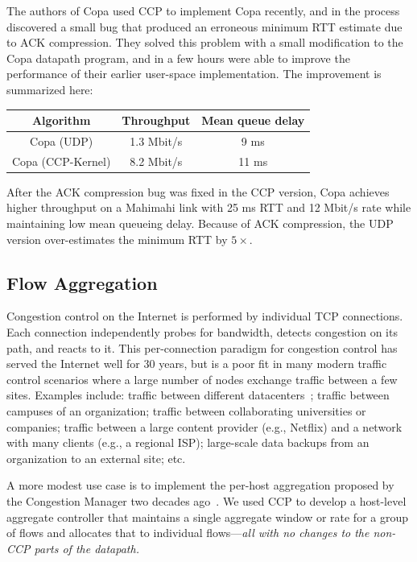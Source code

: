 The authors of Copa used CCP to implement Copa recently, and in the process discovered a small bug that produced an erroneous minimum RTT estimate due to ACK compression. They solved this problem with a small modification to the Copa datapath program,
and in a few hours were able to improve the performance of their earlier user-space implementation. The improvement is summarized here:\\

    \begin{tabular}{c|c|c}
        Algorithm & Throughput & Mean queue delay \\
        \hline
        Copa (UDP) & 1.3 Mbit/s & 9 ms\\
        Copa (CCP-Kernel) & 8.2 Mbit/s  & 11 ms\\
    \end{tabular}

\smallskip
After the ACK compression bug was fixed in the CCP version, Copa achieves higher throughput on a Mahimahi link with 25 ms RTT and 12 Mbit/s rate while maintaining low mean queueing delay. Because of ACK compression, the UDP version over-estimates the minimum RTT by $5\times$.

\subsection{Flow Aggregation}
\label{s:capabilities:agg}

Congestion control on the Internet is performed by individual TCP connections. Each connection independently probes for bandwidth, detects congestion on its path, and reacts to it.
This per-connection paradigm for congestion control has served the Internet well for 30 years, but is a poor fit in many modern traffic control scenarios where a large number of nodes exchange traffic between a few sites.
Examples include: traffic between different datacenters~\cite{b4, swan}; traffic between campuses of an organization; traffic between collaborating universities or companies; traffic between a large content provider (e.g., Netflix) and a network with many clients (e.g., a regional ISP); large-scale data backups from an organization to an external site; etc.

A more modest use case is to implement the per-host aggregation proposed by the
Congestion Manager two decades ago~\cite{cm}. We used CCP to develop a
host-level aggregate controller that maintains a single aggregate window or rate
for a group of flows and allocates that to individual flows---{\em all with no
  changes to the non-CCP parts of the datapath.}

